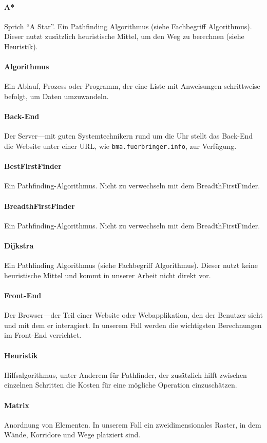 \documentclass[12pt,a4paper,german]{report}
\begin{document}
\paragraph{A*} Sprich ``A Star''. Ein Pathfinding Algorithmus (siehe Fachbegriff Algorithmus). Dieser nutzt zusätzlich heuristische Mittel, um den Weg zu berechnen (siehe Heuristik).
\paragraph{Algorithmus} Ein Ablauf, Prozess oder Programm, der eine Liste mit Anweisungen schrittweise befolgt, um Daten umzuwandeln.
\paragraph{Back-End} Der Server---mit guten Systemtechnikern rund um die Uhr stellt das Back-End die Website unter einer URL, wie \texttt{bma.fuerbringer.info}, zur Verfügung.
\paragraph{BestFirstFinder} Ein Pathfinding-Algorithmus. Nicht zu verwechseln mit dem BreadthFirstFinder.
\paragraph{BreadthFirstFinder} Ein Pathfinding-Algorithmus. Nicht zu verwechseln mit dem BreadthFirstFinder.
\paragraph{Dijkstra} Ein Pathfinding Algorithmus (siehe Fachbegriff Algorithmus). Dieser nutzt keine heuristische Mittel und kommt in unserer Arbeit nicht direkt vor.
\paragraph{Front-End} Der Browser---der Teil einer Website oder Webapplikation, den der Benutzer sieht und mit dem er interagiert. In unserem Fall werden die wichtigsten Berechnungen im Front-End verrichtet.
\paragraph{Heuristik} Hilfsalgorithmus, unter Anderem für Pathfinder, der zusätzlich hilft zwischen einzelnen Schritten die Kosten für eine mögliche Operation einzuschätzen.
\paragraph{Matrix} Anordnung von Elementen. In unserem Fall ein zweidimensionales Raster, in dem Wände, Korridore und Wege platziert sind.
\end{document}
